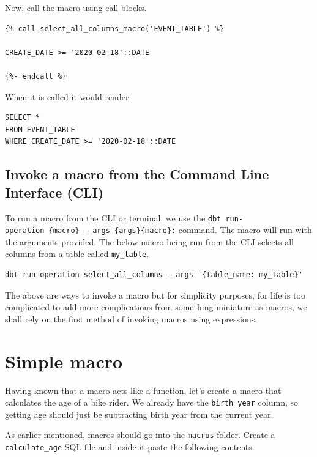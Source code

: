 \documentclass[
]{book}
\begin{document}
Now, call the macro using call blocks.

\begin{verbatim}
{% call select_all_columns_macro('EVENT_TABLE') %}

CREATE_DATE >= '2020-02-18'::DATE

{%- endcall %}
\end{verbatim}

When it is called it would render:

\begin{verbatim}
SELECT *
FROM EVENT_TABLE
WHERE CREATE_DATE >= '2020-02-18'::DATE
\end{verbatim}

\hypertarget{invoke-a-macro-from-the-command-line-interface-cli}{%
\subsection{Invoke a macro from the Command Line Interface (CLI)}\label{invoke-a-macro-from-the-command-line-interface-cli}}

To run a macro from the CLI or terminal, we use the \texttt{dbt\ run-operation\ \{macro\}\ -\/-args\ \textquotesingle{}\{args\}\textquotesingle{}\{macro\}:} command. The macro will run with the arguments provided. The below macro being run from the CLI selects all columns from a table called \texttt{my\_table}.

\begin{verbatim}
dbt run-operation select_all_columns --args '{table_name: my_table}'
\end{verbatim}

The above are ways to invoke a macro but for simplicity purposes, for life is too complicated to add more complications from something miniature as macros, we shall rely on the first method of invoking macros using expressions.

\hypertarget{simple-macro}{%
\section{Simple macro}\label{simple-macro}}

Having known that a macro acts like a function, let's create a macro that calculates the age of a bike rider. We already have the \texttt{birth\_year} column, so getting age should just be subtracting birth year from the current year.

As earlier mentioned, macros should go into the \texttt{macros} folder. Create a \texttt{calculate\_age} SQL file and inside it paste the following contents.
\end{document}
